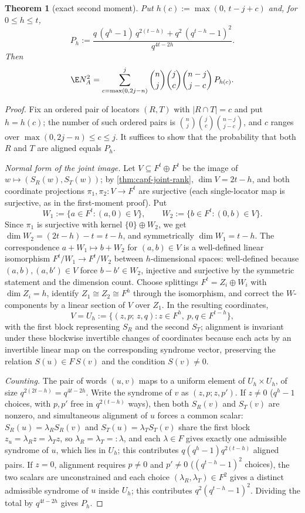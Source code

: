 \documentclass[11pt]{article}
\newtheorem{theorem}{Theorem}[section]
\theoremstyle{definition}
\theoremstyle{remark}
\begin{document}
\begin{theorem}[exact second moment]\label{thm:capf-second-moment}
Put $h(c):=\max(0,\,t-j+c)$ and, for $0\le h\le t$,
\[
P_h:=
\frac{q\,(q^h-1)\,q^{2(t-h)}+q^2\,(q^{t-h}-1)^2}{q^{4t-2h}} .
\]
Then
\[
\E N_A^2
=
\sum_{c=\max(0,2j-n)}^{j}
\binom{n}{j}\binom{j}{c}\binom{n-j}{j-c}\,
P_{h(c)} .
\]
\end{theorem}

\begin{proof}
Fix an ordered pair of locators $(R,T)$ with $|R\cap T|=c$ and put $h=h(c)$; the number of such ordered pairs is $\binom nj\binom jc\binom{n-j}{j-c}$, and $c$ ranges over $\max(0,2j-n)\le c\le j$.  It suffices to show that the probability that both $R$ and $T$ are aligned equals $P_h$.

\emph{Normal form of the joint image.}  Let $V\subseteq F^t\oplus F^t$ be the image of $w\mapsto(S_R(w),S_T(w))$; by \cref{thm:capf-joint-rank}, $\dim V=2t-h$, and both coordinate projections $\pi_1,\pi_2:V\to F^t$ are surjective \textup{(each single-locator map is surjective, as in the first-moment proof)}.  Put
\[
        W_1:=\{a\in F^t:(a,0)\in V\},
        \qquad
        W_2:=\{b\in F^t:(0,b)\in V\}.
\]
Since $\pi_1$ is surjective with kernel $\{0\}\oplus W_2$, we get $\dim W_2=(2t-h)-t=t-h$, and symmetrically $\dim W_1=t-h$.  The correspondence $a+W_1\mapsto b+W_2$ for $(a,b)\in V$ is a well-defined linear isomorphism $F^t/W_1\to F^t/W_2$ between $h$-dimensional spaces: well-defined because $(a,b),(a,b')\in V$ force $b-b'\in W_2$, injective and surjective by the symmetric statement and the dimension count.  Choose splittings $F^t=Z_i\oplus W_i$ with $\dim Z_i=h$, identify $Z_1\cong Z_2\cong F^h$ through the isomorphism, and correct the $W$-components by a linear section of $V$ over $Z_1$.  In the resulting coordinates,
\[
        V=U_h:=\{(z,p;\,z,q):z\in F^h,\ p,q\in F^{t-h}\},
\]
with the first block representing $S_R$ and the second $S_T$; alignment is invariant under these blockwise invertible changes of coordinates because each acts by an invertible linear map on the corresponding syndrome vector, preserving the relation $S(u)\in F\,S(v)$ and the condition $S(v)\ne0$.

\emph{Counting.}  The pair of words $(u,v)$ maps to a uniform element of $U_h\times U_h$, of size $q^{2(2t-h)}=q^{4t-2h}$.  Write the syndrome of $v$ as $(z,p;z,p')$.  If $z\ne0$ \textup{($q^h-1$ choices, with $p,p'$ free in $q^{2(t-h)}$ ways)}, then both $S_R(v)$ and $S_T(v)$ are nonzero, and simultaneous alignment of $u$ forces a common scalar: $S_R(u)=\lambda_R S_R(v)$ and $S_T(u)=\lambda_T S_T(v)$ share the first block $z_u=\lambda_Rz=\lambda_Tz$, so $\lambda_R=\lambda_T=:\lambda$, and each $\lambda\in F$ gives exactly one admissible syndrome of $u$, which lies in $U_h$; this contributes $q(q^h-1)q^{2(t-h)}$ aligned pairs.  If $z=0$, alignment requires $p\ne0$ and $p'\ne0$ \textup{($(q^{t-h}-1)^2$ choices)}, the two scalars are unconstrained and each choice $(\lambda_R,\lambda_T)\in F^2$ gives a distinct admissible syndrome of $u$ inside $U_h$; this contributes $q^2(q^{t-h}-1)^2$.  Dividing the total by $q^{4t-2h}$ gives $P_h$.
\end{proof}
\end{document}
